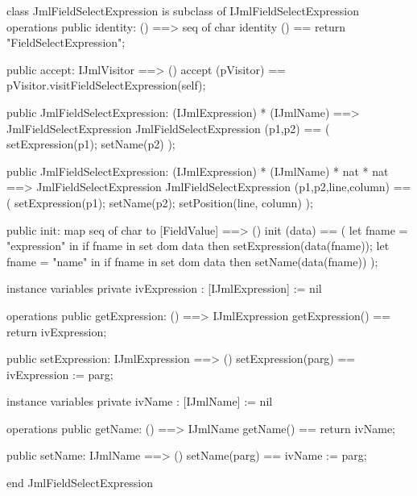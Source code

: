 \begin{vdm_al}
class JmlFieldSelectExpression is subclass of IJmlFieldSelectExpression
operations
  public identity: () ==> seq of char
  identity () == return "FieldSelectExpression";

  public accept: IJmlVisitor ==> ()
  accept (pVisitor) == pVisitor.visitFieldSelectExpression(self);

  public JmlFieldSelectExpression:
    (IJmlExpression) *
    (IJmlName) ==> JmlFieldSelectExpression
  JmlFieldSelectExpression (p1,p2) == 
    ( setExpression(p1);
      setName(p2) );

  public JmlFieldSelectExpression:
    (IJmlExpression) *
    (IJmlName) *
    nat *
    nat ==> JmlFieldSelectExpression
  JmlFieldSelectExpression (p1,p2,line,column) == 
    ( setExpression(p1);
      setName(p2);
      setPosition(line, column) );

  public init: map seq of char to [FieldValue] ==> ()
  init (data) ==
    ( let fname = "expression" in
        if fname in set dom data
        then setExpression(data(fname));
      let fname = "name" in
        if fname in set dom data
        then setName(data(fname)) );

instance variables
  private ivExpression : [IJmlExpression] := nil

operations
  public getExpression: () ==> IJmlExpression
  getExpression() == return ivExpression;

  public setExpression: IJmlExpression ==> ()
  setExpression(parg) == ivExpression := parg;

instance variables
  private ivName : [IJmlName] := nil

operations
  public getName: () ==> IJmlName
  getName() == return ivName;

  public setName: IJmlName ==> ()
  setName(parg) == ivName := parg;

end JmlFieldSelectExpression
\end{vdm_al}

